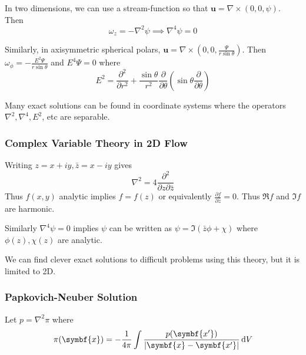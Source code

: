 \documentclass{jknotes}
\begin{document}
In two dimensions, we can use a stream-function so that $\symbf{u} = \nabla
\times (0,0,\psi)$. Then
\begin{equation}
	\omega_z = -\nabla^2 \psi \implies \nabla^4 \psi = 0
\end{equation}

Similarly, in axisymmetric spherical polars, $\symbf{u} = \nabla \times
(0,0,\frac{\Psi}{r \sin \theta})$. Then $\omega_\phi = -\frac{E^2 \Psi}{r\sin
\theta}$ and $E^4 \Psi = 0$ where
\begin{equation}
	E^2 = \frac{\partial^2}{\partial r^2} + \frac{\sin \theta}{r^2}
	\frac{\partial}{\partial \theta} \left( \sin \theta
	\frac{\partial}{\partial \theta}\right)
\end{equation}

Many exact solutions can be found in coordinate systems where the operators
$\nabla^2, \nabla^4, E^2$, etc are separable.

\subsubsection{Complex Variable Theory in 2D Flow}
Writing $z = x+iy, \bar{z} = x-iy$ gives
\begin{equation}
	\nabla^2 = 4 \frac{\partial^2}{\partial z \partial \bar{z}}
\end{equation}
Thus $f(x,y)$ analytic implies $f = f(z)$ or equivalently $\frac{\partial
f}{\partial \bar{z}} = 0$. Thus $\Re f$ and $\Im f$ are harmonic.

Similarly $\nabla^4 \psi = 0$ implies $\psi$ can be written as $\psi =
\Im(\bar{z}\phi + \chi)$ where $\phi(z), \chi(z)$ are analytic.

We can find clever exact solutions to difficult problems using this theory,
but it is limited to 2D.

\subsubsection{Papkovich-Neuber Solution}
Let $p = \nabla^2 \pi$ where
\begin{equation}
	\pi(\symbf{x}) = -\frac{1}{4\pi} \int \frac{p(\symbf{x'})}{\left|
	\symbf{x}-\symbf{x'}\right|} \, \diffd V
\end{equation}
\end{document}
